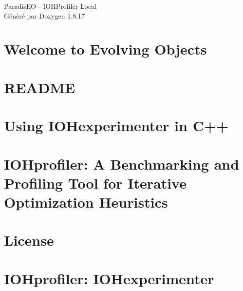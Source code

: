 \let\mypdfximage\pdfximage\def\pdfximage{\immediate\mypdfximage}\documentclass[twoside]{book}
\newcommand{\+}{\discretionary{\mbox{\scriptsize$\hookleftarrow$}}{}{}}
\newcommand{\clearemptydoublepage}{%
  \newpage{\pagestyle{empty}\cleardoublepage}%
}
\begin{document}
\hypersetup{pageanchor=false,
             bookmarksnumbered=true,
             pdfencoding=unicode
            }
\begin{titlepage}
\vspace*{7cm}
\begin{center}%
{\Large Paradis\+EO -\/ I\+O\+H\+Profiler Local }\\
\vspace*{1cm}
{\large Généré par Doxygen 1.8.17}\\
\end{center}
\end{titlepage}
\clearemptydoublepage
{}
\tableofcontents
\clearemptydoublepage
{}
\hypersetup{pageanchor=true}

\chapter{Welcome to Evolving Objects}
\label{index}\hypertarget{index}{}
\chapter{R\+E\+A\+D\+ME}
\label{md_eo_test_mpi__d_i_s_t_r_i_b__x_p__r_e_a_d_m_e}

\chapter{Using I\+O\+Hexperimenter in C++}
\label{md__i_o_hexperimenter_build__cpp__r_e_a_d_m_e}

\chapter{I\+O\+Hprofiler\+: A Benchmarking and Profiling Tool for Iterative Optimization Heuristics}
\label{md__i_o_hexperimenter_build__r__r_e_a_d_m_e}

\chapter{License}
\label{md__i_o_hexperimenter__l_i_c_e_n_s_e}

\chapter{I\+O\+Hprofiler\+: I\+O\+Hexperimenter}
\label{md__i_o_hexperimenter__r_e_a_d_m_e}

\end{document}

